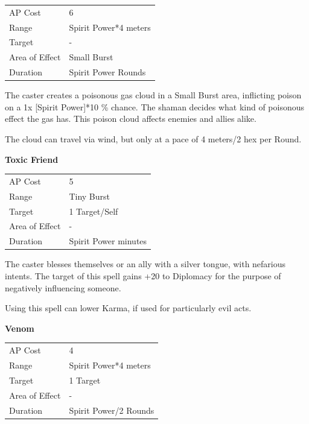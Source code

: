 \documentclass[11pt,a4paper,twocolumn]{book}
\begin{document}
\smallskip
{
	\begin{tabu} to 70mm{| X[l,4] | X[l,7] |}
		\hline
        AP Cost	      	& 6 						\\
        Range     		& Spirit Power*4 meters		\\
        Target      	& -							\\
        Area of Effect  & Small Burst  	 			\\
        Duration     	& Spirit Power Rounds		\\ \hline
	\end{tabu}
		
}
\smallskip

The caster creates a poisonous gas cloud in a Small Burst area, inflicting poison on a 1x [Spirit Power]*10 \% chance. The shaman decides what kind of poisonous effect the gas has. This poison cloud affects enemies and allies alike.

The cloud can travel via wind, but only at a pace of 4 meters/2 hex per Round.

\bigskip
\noindent
\textbf{Toxic Friend}

\smallskip
{
	\begin{tabu} to 70mm{| X[l,4] | X[l,7] |}
		\hline
        AP Cost	      	& 5 						\\
        Range     		& Tiny Burst				\\
        Target      	& 1 Target/Self				\\
        Area of Effect  & -  	 					\\
        Duration     	& Spirit Power minutes		\\ \hline
	\end{tabu}
		
}
\smallskip

The caster blesses themselves or an ally with a silver tongue, with nefarious intents. The target of this spell gains +20 to Diplomacy for the purpose of negatively influencing someone. 

Using this spell can lower Karma, if used for particularly evil acts.

\bigskip
\noindent

\pagebreak
\textbf{Venom}

\smallskip
{
	\begin{tabu} to 70mm{| X[l,4] | X[l,7] |}
		\hline
        AP Cost	      	& 4 						\\
        Range     		& Spirit Power*4 meters				\\
        Target      	& 1 Target		\\
        Area of Effect  & -  	 			\\
        Duration     	& Spirit Power/2 Rounds		\\ \hline
	\end{tabu}
		
}
\smallskip
\end{document}
